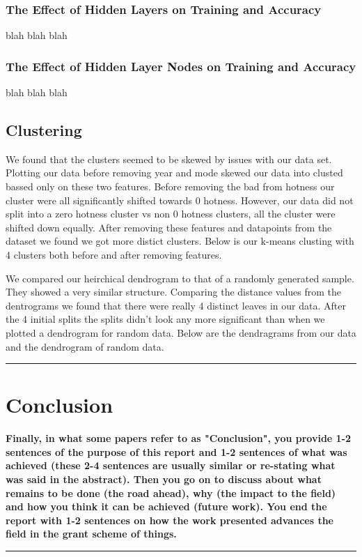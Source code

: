 \documentclass[12pt]{article}
\newcommand{\horizontalLine}{
	\begin{center}
		\hrule width 1.0\textwidth
	\end{center}
}
\newcommand{\smallHorizontalLine}{
    \begin{center}
        \hrule width 0.5\textwidth
    \end{center}}
\begin{document}
\subsubsection{The Effect of Hidden Layers on Training and Accuracy}
\label{subsubsec:annHiddenLayerResults}
blah blah blah

\subsubsection{The Effect of Hidden Layer Nodes on Training and Accuracy}
\label{subsubsec:annHiddenLayerNodesResults}
blah blah blah
\subsection{Clustering}
\label{subsec:clusteringResults}

We found that the clusters seemed to be skewed by issues with our data set. Plotting our data before removing year and mode skewed our data into clusted bassed only on these two features. Before removing the bad from hotness our cluster were all significantly shifted towards 0 hotness. However, our data did not split into a zero hotness cluster vs non 0 hotness clusters, all the cluster were shifted down equally. After removing these features and datapoints from the dataset we found we got more distict clusters. Below is our k-means clusting with 4 clusters both before and after removing features.


We compared our heirchical dendrogram to that of a randomly generated sample. They showed a very similar structure. Comparing the distance values from the dentrograms we found that there were really 4 distinct leaves in our data. After the 4 initial splits the splits didn't look any more significant than when we plotted a dendrogram for random data. Below are the dendragrams from our data and the dendrogram of random data.


  


\horizontalLine
\section{Conclusion}
\label{sec:conclusion}
\textbf{Finally, in what some papers refer to as "Conclusion", you provide 1-2 sentences of the purpose
of this report and 1-2 sentences of what was achieved (these 2-4 sentences are usually similar
or re-stating what was said in the abstract). Then you go on to discuss about what remains to
be done (the road ahead), why (the impact to the field) and how you think it can be achieved
(future work). You end the report with 1-2 sentences on how the work presented advances the
field in the grant scheme of things.}
\smallHorizontalLine
\end{document}
